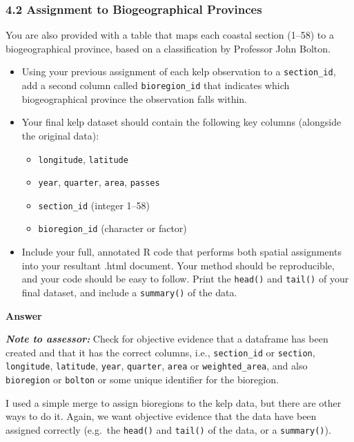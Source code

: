 \documentclass[
  british,
  10pt,
]{article}
\providecommand{\tightlist}{%
  \setlength{\itemsep}{0pt}\setlength{\parskip}{0pt}}
\let\oldtexttt\texttt
\renewcommand{\texttt}[1]{\oldtexttt{\small #1}}
\begin{document}
\subsubsection{4.2 Assignment to Biogeographical
Provinces}\label{assignment-to-biogeographical-provinces}

You are also provided with a table that maps each coastal section
(1--58) to a biogeographical province, based on a classification by
Professor John Bolton.

\begin{itemize}
\tightlist
\item
  Using your previous assignment of each kelp observation to a
  \texttt{section\_id}, add a second column called
  \texttt{bioregion\_id} that indicates which biogeographical province
  the observation falls within.
\item
  Your final kelp dataset should contain the following key columns
  (alongside the original data):

  \begin{itemize}
  \tightlist
  \item
    \texttt{longitude}, \texttt{latitude}
  \item
    \texttt{year}, \texttt{quarter}, \texttt{area}, \texttt{passes}
  \item
    \texttt{section\_id} (integer 1--58)
  \item
    \texttt{bioregion\_id} (character or factor)
  \end{itemize}
\item
  Include your full, annotated R code that performs both spatial
  assignments into your resultant .html document. Your method should be
  reproducible, and your code should be easy to follow. Print the
  \texttt{head()} and \texttt{tail()} of your final dataset, and include
  a \texttt{summary()} of the data.
\end{itemize}

\textbf{Answer}

\textbf{\emph{Note to assessor:}} Check for objective evidence that a
dataframe has been created and that it has the correct columns, i.e.,
\texttt{section\_id} or \texttt{section}, \texttt{longitude},
\texttt{latitude}, \texttt{year}, \texttt{quarter}, \texttt{area} or
\texttt{weighted\_area}, and also \texttt{bioregion} or \texttt{bolton}
or some unique identifier for the bioregion.

I used a simple merge to assign bioregions to the kelp data, but there
are other ways to do it. Again, we want objective evidence that the data
have been assigned correctly (e.g.~the \texttt{head()} and
\texttt{tail()} of the data, or a \texttt{summary()}).
\end{document}
